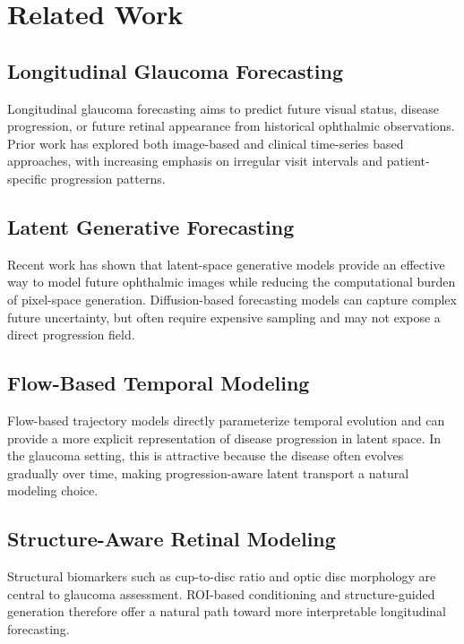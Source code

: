 \section{Related Work}

\subsection{Longitudinal Glaucoma Forecasting}

Longitudinal glaucoma forecasting aims to predict future visual status, disease progression, or future retinal appearance from historical ophthalmic observations. Prior work has explored both image-based and clinical time-series based approaches, with increasing emphasis on irregular visit intervals and patient-specific progression patterns.

\subsection{Latent Generative Forecasting}

Recent work has shown that latent-space generative models provide an effective way to model future ophthalmic images while reducing the computational burden of pixel-space generation. Diffusion-based forecasting models can capture complex future uncertainty, but often require expensive sampling and may not expose a direct progression field.

\subsection{Flow-Based Temporal Modeling}

Flow-based trajectory models directly parameterize temporal evolution and can provide a more explicit representation of disease progression in latent space. In the glaucoma setting, this is attractive because the disease often evolves gradually over time, making progression-aware latent transport a natural modeling choice.

\subsection{Structure-Aware Retinal Modeling}

Structural biomarkers such as cup-to-disc ratio and optic disc morphology are central to glaucoma assessment. ROI-based conditioning and structure-guided generation therefore offer a natural path toward more interpretable longitudinal forecasting.
